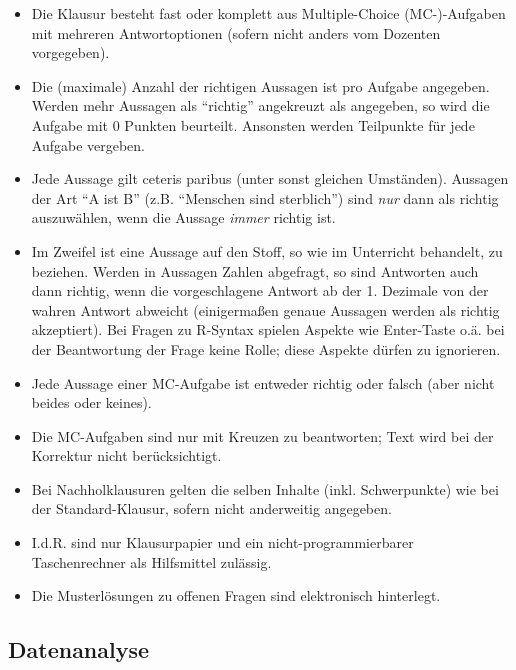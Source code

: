 \documentclass[12pt,ngerman,]{book}
\theoremstyle{definition}
\theoremstyle{definition}
\theoremstyle{remark}
\begin{document}
\begin{itemize}
\item
  Die Klausur besteht fast oder komplett aus Multiple-Choice
  (MC-)-Aufgaben mit mehreren Antwortoptionen (sofern nicht anders vom
  Dozenten vorgegeben).
\item
  Die (maximale) Anzahl der richtigen Aussagen ist pro Aufgabe
  angegeben. Werden mehr Aussagen als ``richtig'' angekreuzt als
  angegeben, so wird die Aufgabe mit 0 Punkten beurteilt. Ansonsten
  werden Teilpunkte für jede Aufgabe vergeben.
\item
  Jede Aussage gilt ceteris paribus (unter sonst gleichen Umständen).
  Aussagen der Art ``A ist B'' (z.B. ``Menschen sind sterblich'') sind
  \emph{nur} dann als richtig auszuwählen, wenn die Aussage \emph{immer}
  richtig ist.
\item
  Im Zweifel ist eine Aussage auf den Stoff, so wie im Unterricht
  behandelt, zu beziehen. Werden in Aussagen Zahlen abgefragt, so sind
  Antworten auch dann richtig, wenn die vorgeschlagene Antwort ab der 1.
  Dezimale von der wahren Antwort abweicht (einigermaßen genaue Aussagen
  werden als richtig akzeptiert). Bei Fragen zu R-Syntax spielen Aspekte
  wie Enter-Taste o.ä. bei der Beantwortung der Frage keine Rolle; diese
  Aspekte dürfen zu ignorieren.
\item
  Jede Aussage einer MC-Aufgabe ist entweder richtig oder falsch (aber
  nicht beides oder keines).
\item
  Die MC-Aufgaben sind nur mit Kreuzen zu beantworten; Text wird bei der
  Korrektur nicht berücksichtigt.
\item
  Bei Nachholklausuren gelten die selben Inhalte (inkl. Schwerpunkte)
  wie bei der Standard-Klausur, sofern nicht anderweitig angegeben.
\item
  I.d.R. sind nur Klausurpapier und ein nicht-programmierbarer
  Taschenrechner als Hilfsmittel zulässig.
\item
  Die Musterlösungen zu offenen Fragen sind elektronisch hinterlegt.
\end{itemize}

\subsection{Datenanalyse}\label{datenanalyse}
\end{document}
